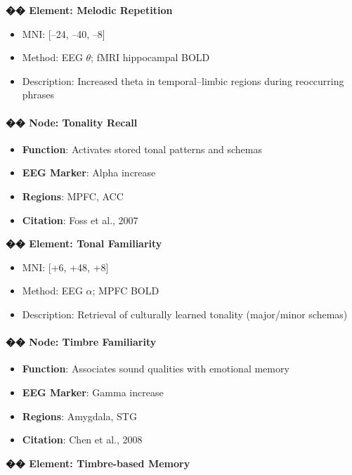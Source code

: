 \textbf{�� Element: Melodic Repetition}

\begin{itemize}
    \item MNI: [–24, –40, –8]
    \item Method: EEG $\theta$; fMRI hippocampal BOLD
    \item Description: Increased theta in temporal–limbic regions during reoccurring phrases
\end{itemize}

\paragraph{�� Node: Tonality Recall}

\begin{itemize}
    \item \textbf{Function}: Activates stored tonal patterns and schemas
    \item \textbf{EEG Marker}: Alpha increase
    \item \textbf{Regions}: MPFC, ACC
    \item \textbf{Citation}: Foss et al., 2007
\end{itemize}

\textbf{�� Element: Tonal Familiarity}

\begin{itemize}
    \item MNI: [+6, +48, +8]
    \item Method: EEG $\alpha$; MPFC BOLD
    \item Description: Retrieval of culturally learned tonality (major/minor schemas)
\end{itemize}

\paragraph{�� Node: Timbre Familiarity}

\begin{itemize}
    \item \textbf{Function}: Associates sound qualities with emotional memory
    \item \textbf{EEG Marker}: Gamma increase
    \item \textbf{Regions}: Amygdala, STG
    \item \textbf{Citation}: Chen et al., 2008
\end{itemize}

\textbf{�� Element: Timbre-based Memory}


